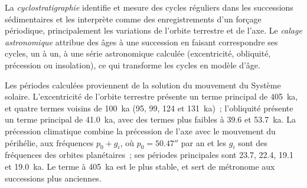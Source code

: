 \begin{definition}\label{def:b3:sequence-stratigraphy:cyclo}
La \emph{cyclostratigraphie} identifie et mesure
des cycles réguliers dans les successions sédimentaires et les interprète comme des enregistrements
d'un forçage périodique, principalement les variations de l'orbite terrestre et de l'axe.
Le \emph{calage astronomique} attribue des âges à une
succession en faisant correspondre ses cycles, un à un, à une
série astronomique calculée (excentricité, obliquité, précession ou insolation), ce qui transforme les
cycles en modèle d'âge.
\end{definition}

Les périodes calculées proviennent de la solution du mouvement du Système solaire.
L'excentricité de l'orbite terrestre présente un terme principal de \qty{405}{ka}, et
quatre termes voisins de \qty{100}{ka} (95, 99, 124 et \qty{131}{ka})~;
l'obliquité présente un terme principal de \qty{41.0}{ka}, avec des termes plus faibles à 39.6 et
\qty{53.7}{ka}. La précession climatique combine la précession de l'axe
avec le mouvement du périhélie, aux fréquences $p_0 + g_i$, où $p_0 =
50.47''$ par an et les $g_i$ sont des fréquences des orbites planétaires~; ses
périodes principales sont 23.7, 22.4, 19.1 et \qty{19.0}{ka}. Le terme à \qty{405}{ka}
est le plus stable, et sert de métronome aux successions plus anciennes.

